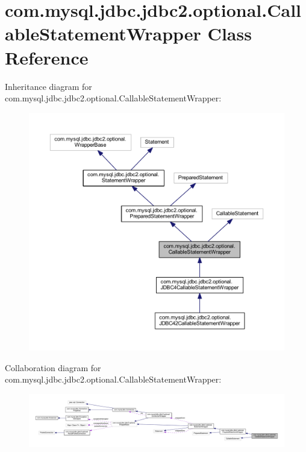 \hypertarget{classcom_1_1mysql_1_1jdbc_1_1jdbc2_1_1optional_1_1_callable_statement_wrapper}{}\section{com.\+mysql.\+jdbc.\+jdbc2.\+optional.\+Callable\+Statement\+Wrapper Class Reference}
\label{classcom_1_1mysql_1_1jdbc_1_1jdbc2_1_1optional_1_1_callable_statement_wrapper}


Inheritance diagram for com.\+mysql.\+jdbc.\+jdbc2.\+optional.\+Callable\+Statement\+Wrapper\+:
\nopagebreak
\begin{figure}[H]
\begin{center}
\leavevmode
\includegraphics[width=350pt]{classcom_1_1mysql_1_1jdbc_1_1jdbc2_1_1optional_1_1_callable_statement_wrapper__inherit__graph}
\end{center}
\end{figure}


Collaboration diagram for com.\+mysql.\+jdbc.\+jdbc2.\+optional.\+Callable\+Statement\+Wrapper\+:
\nopagebreak
\begin{figure}[H]
\begin{center}
\leavevmode
\includegraphics[width=350pt]{classcom_1_1mysql_1_1jdbc_1_1jdbc2_1_1optional_1_1_callable_statement_wrapper__coll__graph}
\end{center}
\end{figure}
